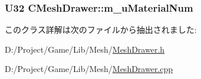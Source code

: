 \subsubsection[{m\+\_\+u\+Material\+Num}]{\setlength{\rightskip}{0pt plus 5cm}U32 C\+Mesh\+Drawer\+::m\+\_\+u\+Material\+Num\hspace{0.3cm}{\ttfamily [private]}}\label{class_c_mesh_drawer_a1f43f0a290e81f825c5b504df8d73f04}


このクラス詳解は次のファイルから抽出されました\+:\begin{DoxyCompactItemize}
\item 
D\+:/\+Project/\+Game/\+Lib/\+Mesh/\hyperlink{_mesh_drawer_8h}{Mesh\+Drawer.\+h}\item 
D\+:/\+Project/\+Game/\+Lib/\+Mesh/\hyperlink{_mesh_drawer_8cpp}{Mesh\+Drawer.\+cpp}\end{DoxyCompactItemize}
